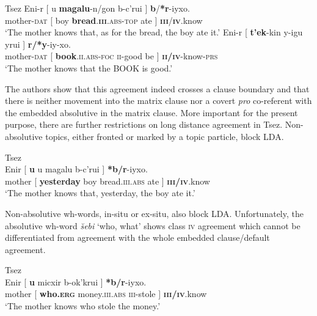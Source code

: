 \documentclass[output=paper
,modfonts
,nonflat]{langsci/langscibook}
\begin{document}
\begin{exe}
	\ex Tsez \citep[][610-611]{Polinsky_Potsdam2001}
	\xlist
	\ex \label{ex:tsez_overt_top}
		\gll Eni-r [ u \textbf{magalu}-n/gon b-c’ru\textipa{\textbeltl}i ] \textbf{b}/\textbf{*r}-iyxo.\\
			mother-\textsc{dat} [ boy \textbf{bread}.\textsc{\textbf{iii}.abs-top} ate ] \textsc{\textbf{iii}}/\textsc{\textbf{iv}}.know\\
		\glt `The mother knows that, as for the bread, the boy ate it.' 
	\ex \label{ex:tsez_overt_foc}
		\gll Eni-r [ \textbf{t'ek}-kin y-igu yru\textipa{\textbeltl}i ] \textbf{r/*y}-iy-xo.\\
			 mother-\textsc{dat} [ \textbf{book}.\textsc{ii.abs-foc}  \textsc{ii}-good be ] \textbf{\textsc{ii/iv}}-know-\textsc{prs}\\
	    \glt `The mother knows that the BOOK is good.'
	\endxlist
\end{exe}
The authors show that this agreement indeed crosses a clause boundary and that there is neither movement into the matrix clause nor a covert \textit{pro} co-referent with the embedded absolutive in the matrix clause. More important for the present purpose, there are further restrictions on long distance agreement in Tsez. Non-absolutive topics, either fronted or marked by a topic particle, block LDA.
\begin{exe}
	\ex Tsez \citep[][636]{Polinsky_Potsdam2001} \label{ex:tsez_nonabs_top}\\
		\gll Enir [ \textbf{\textipa{\textcrh}u\textipa{\textbeltl}} u magalu b-c’ru\textipa{\textbeltl}i ] \textbf{*b/r}-iyxo.\\
		mother [ \textbf{yesterday} boy bread.\textsc{iii.abs} ate ] \textsc{\textbf{iii/iv}}.know\\
		\glt `The mother knows that, yesterday, the boy ate it.'
\end{exe}
Non-absolutive wh-words, in-situ or ex-situ, also block LDA. Unfortunately, the absolutive wh-word \textit{\u{s}ebi} `who, what' shows class \textsc{iv} agreement which cannot be differentiated from agreement with the whole embedded clause/default agreement.
\begin{exe}
	\ex Tsez \citep[][634]{Polinsky_Potsdam2001} \label{ex:tsez_wh}\\
		\gll Enir [ \textbf{\textipa{\textbeltl}u} micxir b-ok'kru\textipa{\textbeltl}i ] \textbf{*b/r}-iyxo.\\
		 mother [ \textbf{who.\textsc{erg}} money.\textsc{iii.abs} \textsc{iii}-stole ]	\textsc{\textbf{iii/iv}}.know\\
		\glt `The mother knows who stole the money.'
\end{exe}
\end{document}
